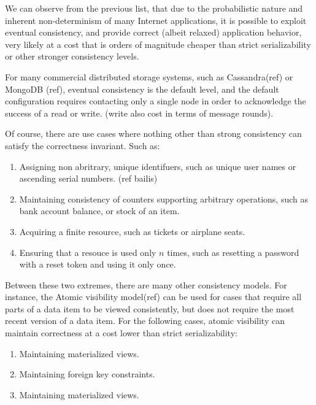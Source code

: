 We can observe from the previous list, that due to the probabilistic nature and 
inherent non-determinism of many Internet applications, it is possible to exploit 
eventual consistency, and provide correct (albeit relaxed) application behavior, 
very likely at a cost that is orders of magnitude cheaper than strict serializability 
or other stronger consistency levels. 

For many commercial distributed storage
systems, such as Cassandra(ref) or MongoDB (ref), eventual consistency is the default
level, and the default configuration requires contacting only a single node in
order to acknowledge the success of a read or write. (write also cost in terms
of message rounds).

Of course, there are use cases where nothing other than strong consistency can
satisfy the correctness invariant. Such as:

\begin{enumerate}

\item Assigning non abritrary, unique identifuers, such as unique user names or
ascending serial numbers. (ref bailis)

\item Maintaining consistency of counters supporting arbitrary operations, such
as bank account balance, or stock of an item. 

\item Acquiring a finite resource, such as tickets or airplane seats. 

\item Ensuring that a resouce is used only $n$ times, such as resetting a
password with a reset token and using it only once. 
\end{enumerate}

 Between these two extremes, there are many other consistency models. For
 instance, the Atomic visibility model(ref) can be used for cases that
 require all parts of a data item to be viewed consistently, but does not require
 the most recent version of a data item. For the following cases, 
 atomic visibility can maintain correctness at a cost lower than strict
 serializability: 
\begin{enumerate}
\item Maintaining materialized views.
\item Maintaining foreign key constraints.
\item Maintaining materialized views.
\end{enumerate}

